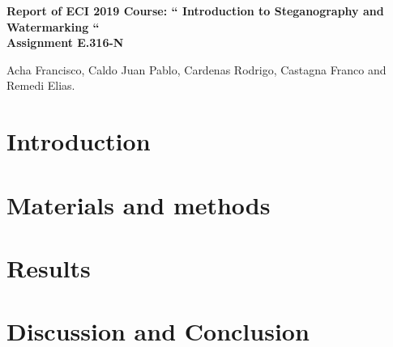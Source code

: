 \documentclass[11pt]{article}
\begin{document}
\pagestyle{empty}

\begin{center}

{\Large {\bf Report of ECI 2019 Course: `` Introduction to Steganography and Watermarking ``}} \\

\bigskip
{\large \bf Assignment E.316-N}
\end{center}

\begin{center}
Acha Francisco, Caldo Juan Pablo, Cardenas Rodrigo, Castagna Franco and Remedi Elias.
\end{center}


\section{Introduction}



\section{Materials and methods}


\section{Results}


\section{Discussion and Conclusion}
\end{document}
